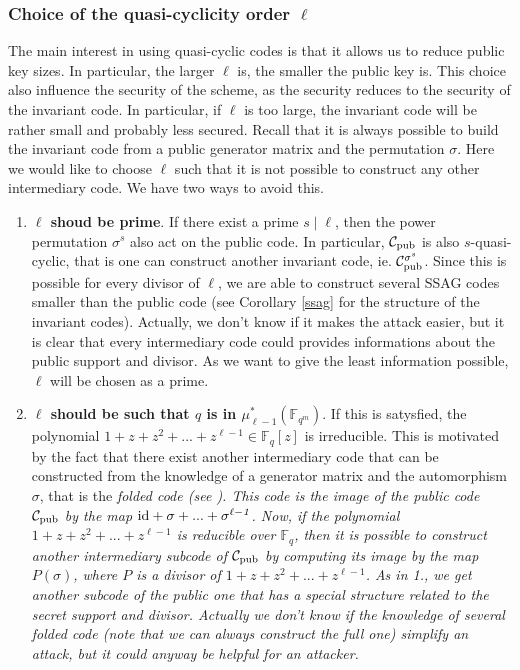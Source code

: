 \documentclass[10pt]{article}
\newcommand{\s}{\vspace{0.3cm}}
\newcommand{\C}{\mathcal{C}}
\newcommand{\fqm}{\mathbb{F}_{q^m}}
\newcommand{\fq}{\mathbb{F}_q}
\begin{document}
\s

\subsubsection{Choice of the quasi-cyclicity order $\ell$}

\s

The main interest in using quasi-cyclic codes is that it allows us to reduce public key sizes. In particular, the larger $\ell$ is, the smaller the public key is. This choice also influence the security of the scheme, as the security reduces to the security of the invariant code. In particular, if $\ell$ is too large, the invariant code will be rather small and probably less secured. Recall that it is always possible to build the invariant code from a public generator matrix and the permutation $\sigma$. Here we would like to choose $\ell$ such that it is not possible to construct any other intermediary code. We have two ways to avoid this.

\s

\begin{enumerate}
\item \textbf{$\ell$ shoud be prime}. If there exist a prime $s \mid \ell$, then the power permutation $\sigma^s$ also act on the public code. In particular, $\C_{\rm pub}$ is also $s$-quasi-cyclic, that is one can construct another invariant code, ie. $\C_{\rm pub}^{\sigma^s}$. Since this is possible for every divisor of $\ell$, we are able to construct several SSAG codes smaller than the public code (see Corollary \ref{ssag} for the structure of the invariant codes). Actually, we don't know if it makes the attack easier, but it is clear that every intermediary code could provides informations about the public support and divisor. As we want to give the least information possible, $\ell$ will be chosen as a prime.

\item \textbf{$\ell$ should be such that $q$ is in $\mu_{\ell -1}^*(\fqm)$}. If this is satysfied, the polynomial $1+z+z^2+...+z^{\ell-1} \in \fq[z]$ is irreducible. This is motivated by the fact that there exist another intermediary code that can be constructed from the knowledge of a generator matrix and the automorphism $\sigma$, that is the \it{folded code} \rm (see \cite{FOP}). This code is the image of the public code $\C_{\rm pub}$ by the map $\rm id \it +\sigma+...+\sigma^{\ell-1}$. Now, if the polynomial $1+z+z^2+...+z^{\ell-1}$ is reducible over $\fq$, then it is possible to construct another intermediary subcode of $\C_{\rm pub}$ by computing its image by the map $P(\sigma)$, where $P$ is a divisor of $1+z+z^2+...+z^{\ell-1}$. As in 1., we get another subcode of the public one that has a special structure related to the secret support and divisor. Actually we don't know if the knowledge of several folded code (note that we can always construct the full one) simplify an attack, but it could anyway be helpful for an attacker.
\end{enumerate}
\end{document}

